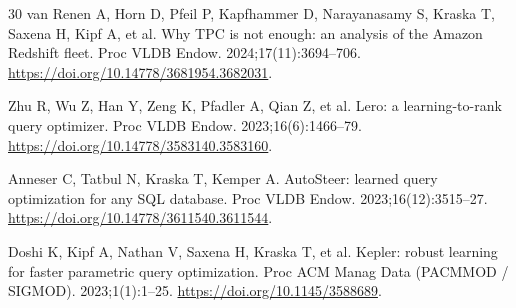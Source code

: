 \documentclass[10pt,a4paper]{article}
\begin{document}
{\begin{thebibliography}{30}
van Renen A, Horn D, Pfeil P, Kapfhammer D, Narayanasamy S, Kraska T, Saxena H, Kipf A, et al. Why TPC is not enough: an analysis of the Amazon Redshift fleet. Proc VLDB Endow. 2024;17(11):3694--706. \url{https://doi.org/10.14778/3681954.3682031}.

Zhu R, Wu Z, Han Y, Zeng K, Pfadler A, Qian Z, et al. Lero: a learning-to-rank query optimizer. Proc VLDB Endow. 2023;16(6):1466--79. \url{https://doi.org/10.14778/3583140.3583160}.

Anneser C, Tatbul N, Kraska T, Kemper A. AutoSteer: learned query optimization for any SQL database. Proc VLDB Endow. 2023;16(12):3515--27. \url{https://doi.org/10.14778/3611540.3611544}.

Doshi K, Kipf A, Nathan V, Saxena H, Kraska T, et al. Kepler: robust learning for faster parametric query optimization. Proc ACM Manag Data (PACMMOD / SIGMOD). 2023;1(1):1--25. \url{https://doi.org/10.1145/3588689}.

\end{thebibliography}
}

\end{document}

